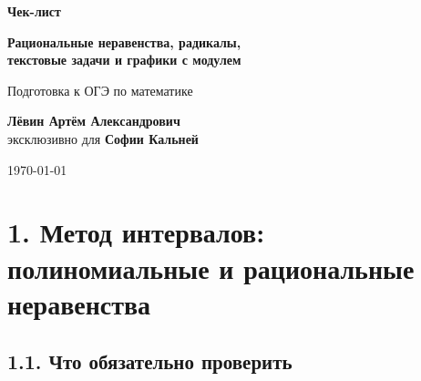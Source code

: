 \documentclass[a4paper,12pt]{article}
\begin{document}

\begin{titlepage}
\thispagestyle{empty}
\centering

\vspace*{2.2cm}

{\Large
\textcolor{darkaccent}{\textbf{Чек-лист}}
\par}

\vspace{0.8cm}

{\huge\bfseries
Рациональные неравенства, радикалы,\\[0.2cm]
текстовые задачи и графики с модулем
\par}

\vspace{0.7cm}

{\large
Подготовка к ОГЭ по математике
\par}

\vfill

{\large
\textbf{Лёвин Артём Александрович}\\[0.15cm]
эксклюзивно для \textbf{Софии Кальней}
\par}

\vspace{0.6cm}

{\large
\today
\par}

\vfill


\end{titlepage}


\section*{\textcolor{darkaccent}{
1. Метод интервалов: полиномиальные и рациональные неравенства
}}

\subsection*{1.1. Что обязательно проверить}
\end{document}
